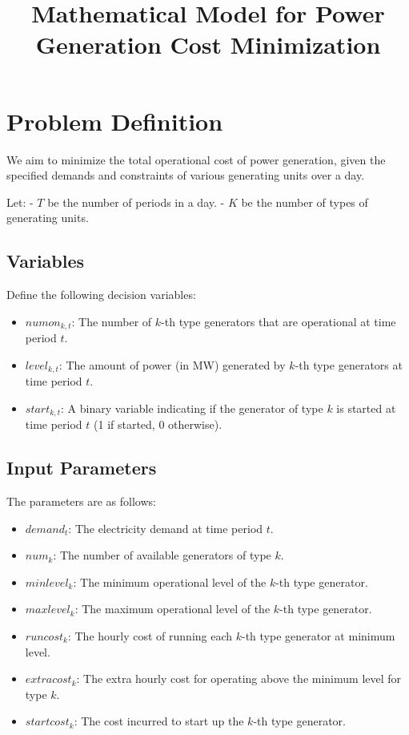 \documentclass{article}
\begin{document}
\title{Mathematical Model for Power Generation Cost Minimization}
\author{}
\date{}
\maketitle

\section*{Problem Definition}

We aim to minimize the total operational cost of power generation, given the specified demands and constraints of various generating units over a day. 

Let:
- \( T \) be the number of periods in a day.
- \( K \) be the number of types of generating units.

\subsection*{Variables}

Define the following decision variables:
\begin{itemize}
    \item \( numon_{k, t} \): The number of \( k \)-th type generators that are operational at time period \( t \).
    \item \( level_{k, t} \): The amount of power (in MW) generated by \( k \)-th type generators at time period \( t \).
    \item \( start_{k, t} \): A binary variable indicating if the generator of type \( k \) is started at time period \( t \) (1 if started, 0 otherwise).
\end{itemize}

\subsection*{Input Parameters}

The parameters are as follows:
\begin{itemize}
    \item \( demand_t \): The electricity demand at time period \( t \).
    \item \( num_k \): The number of available generators of type \( k \).
    \item \( minlevel_k \): The minimum operational level of the \( k \)-th type generator.
    \item \( maxlevel_k \): The maximum operational level of the \( k \)-th type generator.
    \item \( runcost_k \): The hourly cost of running each \( k \)-th type generator at minimum level.
    \item \( extracost_k \): The extra hourly cost for operating above the minimum level for type \( k \).
    \item \( startcost_k \): The cost incurred to start up the \( k \)-th type generator.
\end{itemize}
\end{document}
